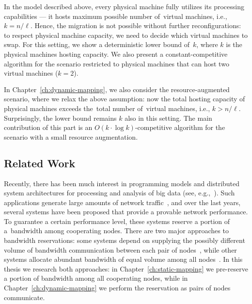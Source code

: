 In the model described above, every physical machine fully utilizes its processing capabilities --- it hosts maximum possible number of~virtual machines, i.e., $k=n/\ell$.
Hence, the migration is not possible without further reconfigurations: to respect physical machine capacity, we need to decide which virtual machines to swap.
For this setting, we show a deterministic lower bound of~$k$, where $k$ is the physical machines hosting capacity.
We also present a constant-competitive algorithm for the scenario restricted to physical machines that can host two virtual machines ($k = 2$).

In Chapter~\ref{ch:dynamic-mapping}, we also consider the resource-augmented scenario, where we relax the above assumption: now the total hosting capacity of physical machines exceeds the~total number of~virtual machines, i.e., $k > n/\ell$.
Surprisingly, the lower bound remains $k$ also in this setting.
The main contribution of this part is an $O(k\cdot \log k)$-competitive algorithm for the scenario with a small resource augmentation.



\subsection{Related Work}


Recently, there has been much interest in programming models and distributed
system architectures for processing and analysis of big data (see, e.g.,~\cite{mapreduce,nodb,shark}).
Such applications
generate large amounts of network traffic~\cite{orchestra,MogPop12,amazonbw},
and over the last years, several systems have been proposed that provide a provable network performance.
To guarantee a certain performance level, these systems reserve a portion of a~bandwidth among cooperating nodes.
There are two major approaches to bandwidth reservations: some systems depend on supplying the possibly different volume of bandwidth communication between each pair of nodes~\cite{faircloud,elasticswitch,seawall}, while other systems allocate abundant bandwidth of equal volume among all nodes~\cite{oktopus,secondnet,drl,gatekeeper,proteus}.
In this thesis we research both approaches: in Chapter~\ref{ch:static-mapping} we pre-reserve a portion of bandwidth among all cooperating nodes, while in Chapter~\ref{ch:dynamic-mapping} we perform the reservation as pairs of nodes communicate.

